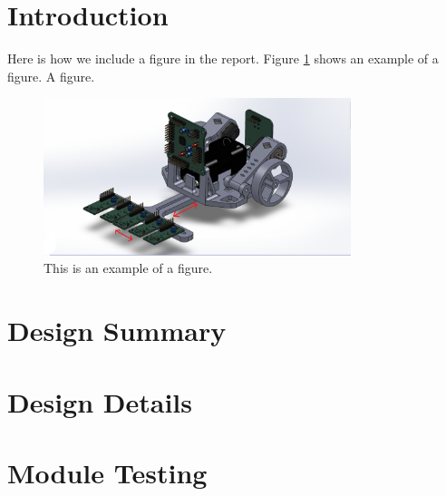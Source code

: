 \documentclass[12pt]{article}
\begin{document}
\newpage
{}

\section{Introduction}

Here is how we include a figure in the report. Figure \ref{fig:example} shows an example of a figure. A figure.

\begin{figure}[H]
  \centering
  \includegraphics[width=0.8\textwidth]{example.png}
  \caption{This is an example of a figure.}
  \label{fig:example}
\end{figure}

\newpage

\section{Design Summary}

\newpage

\section{Design Details}

\newpage

\section{Module Testing}
\end{document}
